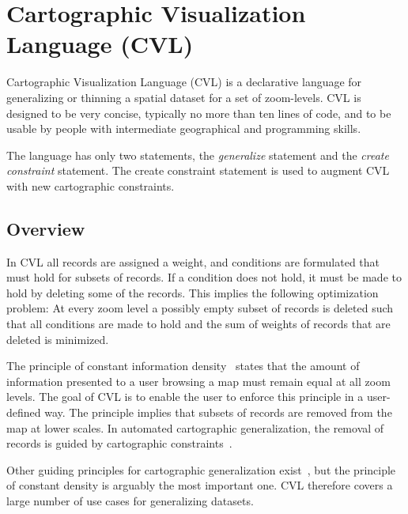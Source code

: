 \section{Cartographic Visualization Language (CVL)}
\label{sec:cvl-language}
Cartographic Visualization Language (CVL) is a declarative language for generalizing or thinning a spatial dataset for a set of zoom-levels. CVL is designed to be very concise, typically no more than ten lines of code, and to be usable by people with intermediate geographical and programming skills.


The language has only two statements, the \emph{generalize} statement and the \emph{create constraint} statement. The create constraint statement is used to augment CVL with new cartographic constraints.

\subsection{Overview}


In CVL all records are assigned a weight, and conditions are formulated that must hold for subsets of records. If a condition does not hold, it must be made to hold by deleting some of the records. This implies the following optimization problem: At every zoom level a possibly empty subset of records is deleted such that all conditions are made to hold and the sum of weights of records that are deleted is minimized.

The principle of constant information density~\cite{toepfer} states that the amount of information presented to a user browsing a map must remain equal at all zoom levels. The goal of CVL is to enable the user to enforce this principle in a user-defined way. The principle implies that subsets of records are removed from the map at lower scales. In automated cartographic generalization, the removal of records is guided by cartographic constraints~\cite{something}.

Other guiding principles for cartographic generalization exist~\cite{something}, but the principle of constant density is arguably the most important one. CVL therefore covers a large number of use cases for generalizing datasets.

